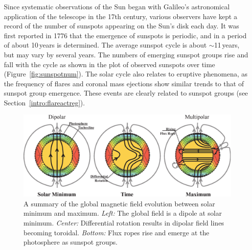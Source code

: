 
Since systematic observations of the Sun began with Galileo's astronomical application of the telescope in the 17th century, various observers have kept a record of the number of sunspots appearing on the Sun's disk each day. It was first reported in 1776 that the emergence of sunspots is periodic, and in \cite{Schwabe:1844} a period of about 10\,years is determined. The average sunspot cycle is about $\sim$11\,years, but may vary by several years. The numbers of emerging sunspot groups rise and fall with the cycle as shown in the plot of observed sunspots over time (Figure~\ref{fig:sunspotnum}).
The solar cycle also relates to eruptive phenomena, as the frequency of flares and coronal mass ejections show similar trends to that of sunspot group emergence. These events are clearly related to sunspot groups (see Section~\ref{intro:flareactreg}).


\begin{figure}[!t]
\centerline{\includegraphics[width = 1.0\textwidth,clip=1]{dynamo_schem.eps}}
\caption[A summary of the magnetic solar cycle.]{A summary of the global magnetic field evolution between solar minimum and maximum. \emph{Left:} The global field is a dipole at solar minimum. \emph{Center:} Differential rotation results in dipolar field lines becoming toroidal. \emph{Bottom:} Flux ropes rise and emerge at the photosphere as sunspot groups.}
\label{fig:globalsummary}
\end{figure}

